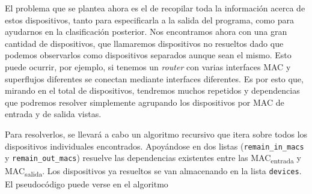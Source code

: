 \documentclass[twoside, 12pt]{epstfg}
\begin{document}
El problema que se plantea ahora es el de recopilar toda la información acerca de estos dispositivos, tanto para especificarla a la salida del programa, como para ayudarnos en la clasificación posterior. Nos encontramos ahora con una gran cantidad de dispositivos, que llamaremos dispositivos no resueltos dado que podemos observarlos como dispositivos separados aunque sean el mismo. Esto puede ocurrir, por ejemplo, si tenemos un \textit{router} con varias interfaces MAC y superflujos diferentes se conectan mediante interfaces diferentes. Es por esto que, mirando en el total de dispositivos, tendremos muchos repetidos y dependencias que podremos resolver simplemente agrupando los dispositivos por MAC de entrada y de salida vistas.

Para resolverlos, se llevará a cabo un algoritmo recursivo que itera sobre todos los dispositivos individuales encontrados. Apoyándose en dos listas (\texttt{remain\_in\_macs} y \texttt{remain\_out\_macs}) resuelve las dependencias existentes entre las MAC\textsubscript{entrada} y MAC\textsubscript{salida}. Los dispositivos ya resueltos se van almacenando en la lista \texttt{devices}. El pseudocódigo puede verse en el algoritmo 
\end{document}
